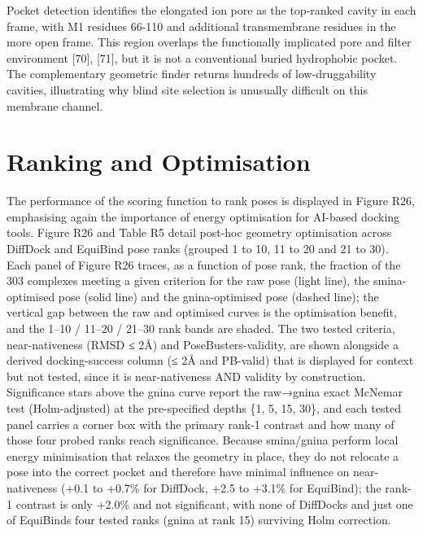 Pocket detection identifies the elongated ion pore as the top-ranked cavity in each frame, with M1 residues 66-110 and additional transmembrane residues in the more open frame. This region overlaps the functionally implicated pore and filter environment {[}70{]}, {[}71{]}, but it is not a conventional buried hydrophobic pocket. The complementary geometric finder returns hundreds of low-druggability cavities, illustrating why blind site selection is unusually difficult on this membrane channel.

\hypertarget{ranking-and-optimisation}{%
\section{Ranking and Optimisation}\label{ranking-and-optimisation}}

The performance of the scoring function to rank poses is displayed in Figure R26, emphasising again the importance of energy optimisation for AI-based docking tools. Figure R26 and Table R5 detail post-hoc geometry optimisation across DiffDock and EquiBind pose ranks (grouped 1 to 10, 11 to 20 and 21 to 30). Each panel of Figure R26 traces, as a function of pose rank, the fraction of the 303 complexes meeting a given criterion for the raw pose (light line), the smina-optimised pose (solid line) and the gnina-optimised pose (dashed line); the vertical gap between the raw and optimised curves is the optimisation benefit, and the 1--10 / 11--20 / 21--30 rank bands are shaded. The two tested criteria, near-nativeness (RMSD ≤ 2Å) and PoseBusters-validity, are shown alongside a derived docking-success column (≤ 2Å and PB-valid) that is displayed for context but not tested, since it is near-nativeness AND validity by construction. Significance stars above the gnina curve report the raw→gnina exact McNemar test (Holm-adjusted) at the pre-specified depths \{1, 5, 15, 30\}, and each tested panel carries a corner box with the primary rank-1 contrast and how many of those four probed ranks reach significance. Because smina/gnina perform local energy minimisation that relaxes the geometry in place, they do not relocate a pose into the correct pocket and therefore have minimal influence on near-nativeness (+0.1 to +0.7\% for DiffDock, +2.5 to +3.1\% for EquiBind); the rank-1 contrast is only +2.0\% and not significant, with none of DiffDock\textquotesingle s and just one of EquiBind\textquotesingle s four tested ranks (gnina at rank 15) surviving Holm correction.

